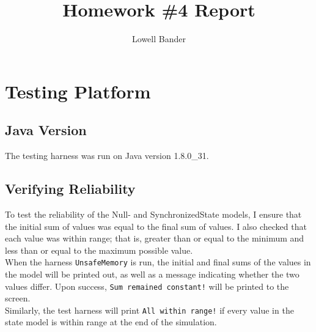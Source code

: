 \documentclass[]{article}
\begin{document}
\title{Homework \#4 Report}
\author{Lowell Bander}
\maketitle

\section{Testing Platform}
\subsection{Java Version}
The testing harness was run on Java version 1.8.0\_31.\\
\subsection{Verifying Reliability}
To test the reliability of the Null- and SynchronizedState models, I ensure that the initial sum of values was equal to the final sum of values. I also checked that each value was within range; that is, greater than or equal to the minimum and less than or equal to the maximum possible value.\\

When the harness \texttt{UnsafeMemory} is run, the initial and final sums of the values in the model will be printed out, as well as a message indicating whether the two values differ. Upon success, \texttt{Sum remained constant!} will be printed to the screen.\\

Similarly, the test harness will print \texttt{All within range!} if every value in the state model is within range at the end of the simulation.
\end{document}
